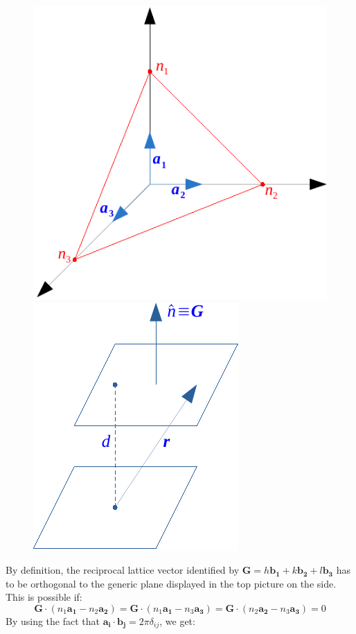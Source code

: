 \documentclass[10.75pt,a4paper,openright,bottom=2cm]{article}
\renewcommand{\Vec}[1]{\boldsymbol{#1}}
\begin{document}
\begin{figure}
    \centering
    \includegraphics{miller.pdf}
    \centering
    \includegraphics{d.pdf}
\end{figure}
By definition, the reciprocal lattice vector identified by $\Vec{G}=h\Vec{b_1}+k\Vec{b_2}+l\Vec{b_3}$ has to be orthogonal to the generic plane displayed in the top picture on the side. This is possible if:
\[
\Vec{G}\cdot(n_1\Vec{a_1}-n_2\Vec{a_2})=\Vec{G}\cdot(n_1\Vec{a_1}-n_3\Vec{a_3})=\Vec{G}\cdot(n_2\Vec{a_2}-n_3\Vec{a_3})=0
\]
By using the fact that $\Vec{a_i}\cdot\Vec{b_j}=2\pi\delta_{ij}$, we get:
\end{document}
